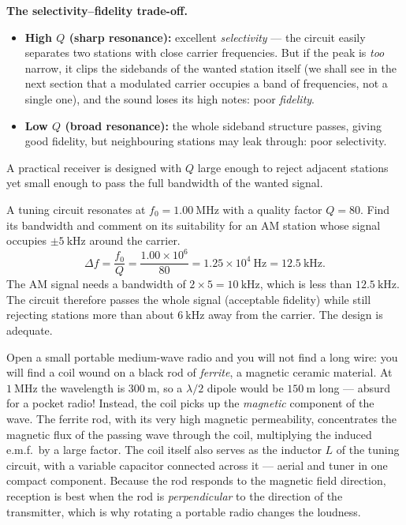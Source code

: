 \documentclass[11pt]{article}
\newcounter{popsec}
\newcounter{popsub}
\newcommand{\courssub}[1]{%
  \stepcounter{popsub}%
  \par\vspace{9pt}\noindent{\popxbold\fontsize{11.5}{13}\selectfont\color{popink}{\color{poporange}\thepopsec.\thepopsub}\hspace{6pt}#1}\par\nopagebreak\vspace{4pt}
}
\begin{document}
\textbf{The selectivity--fidelity trade-off.}\par
\begin{itemize}
  \item \textbf{High $Q$ (sharp resonance):} excellent \emph{selectivity} — the circuit easily separates two stations with close carrier frequencies. But if the peak is \emph{too} narrow, it clips the sidebands of the wanted station itself (we shall see in the next section that a modulated carrier occupies a band of frequencies, not a single one), and the sound loses its high notes: poor \emph{fidelity}.
  \item \textbf{Low $Q$ (broad resonance):} the whole sideband structure passes, giving good fidelity, but neighbouring stations may leak through: poor selectivity.
\end{itemize}
A practical receiver is designed with $Q$ large enough to reject adjacent stations yet small enough to pass the full bandwidth of the wanted signal.

\begin{exoresolu}
A tuning circuit resonates at $f_0 = 1.00\ \mathrm{MHz}$ with a quality factor $Q = 80$. Find its bandwidth and comment on its suitability for an AM station whose signal occupies $\pm 5\ \mathrm{kHz}$ around the carrier.
\tcblower
\[
\Delta f = \frac{f_0}{Q} = \frac{1.00\times10^{6}}{80} = 1.25\times10^{4}\ \mathrm{Hz} = 12.5\ \mathrm{kHz}.
\]
The AM signal needs a bandwidth of $2\times 5 = 10\ \mathrm{kHz}$, which is less than $12.5\ \mathrm{kHz}$. The circuit therefore passes the whole signal (acceptable fidelity) while still rejecting stations more than about $6\ \mathrm{kHz}$ away from the carrier. The design is adequate.
\end{exoresolu}

\courssub{The Ferrite Rod Aerial (GCE favourite)}

\begin{savaistu}
Open a small portable medium-wave radio and you will not find a long wire: you will find a coil wound on a black rod of \emph{ferrite}, a magnetic ceramic material. At $1\ \mathrm{MHz}$ the wavelength is $300\ \mathrm{m}$, so a $\lambda/2$ dipole would be $150\ \mathrm{m}$ long — absurd for a pocket radio! Instead, the coil picks up the \emph{magnetic} component of the wave. The ferrite rod, with its very high magnetic permeability, concentrates the magnetic flux of the passing wave through the coil, multiplying the induced e.m.f.\ by a large factor. The coil itself also serves as the inductor $L$ of the tuning circuit, with a variable capacitor connected across it — aerial and tuner in one compact component. Because the rod responds to the magnetic field direction, reception is best when the rod is \emph{perpendicular} to the direction of the transmitter, which is why rotating a portable radio changes the loudness.
\end{savaistu}
\end{document}
